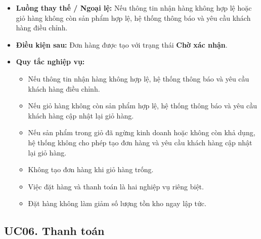 \documentclass[12pt,a4paper]{article}
\begin{document}
\begin{itemize}
\begin{enumerate}
 \end{enumerate}

 \item \textbf{Luồng thay thế / Ngoại lệ:} Nếu thông tin nhận hàng không hợp lệ hoặc giỏ hàng không còn sản phẩm hợp lệ, hệ thống thông báo và yêu cầu khách hàng điều chỉnh.

 \item \textbf{Điều kiện sau:} Đơn hàng được tạo với trạng thái \textbf{Chờ xác nhận}.

 \item \textbf{Quy tắc nghiệp vụ:}

 \begin{itemize}

  \item Nếu thông tin nhận hàng không hợp lệ, hệ thống thông báo và yêu cầu khách hàng điều chỉnh.

  \item Nếu giỏ hàng không còn sản phẩm hợp lệ, hệ thống thông báo và yêu cầu khách hàng cập nhật lại giỏ hàng.

  \item Nếu sản phẩm trong giỏ đã ngừng kinh doanh hoặc không còn khả dụng, hệ thống không cho phép tạo đơn hàng và yêu cầu khách hàng cập nhật lại giỏ hàng.

  \item Không tạo đơn hàng khi giỏ hàng trống.

  \item Việc đặt hàng và thanh toán là hai nghiệp vụ riêng biệt.

  \item Đặt hàng không làm giảm số lượng tồn kho ngay lập tức.

 \end{itemize}

\end{itemize}


\subsection*{UC06. Thanh toán}
\end{document}
